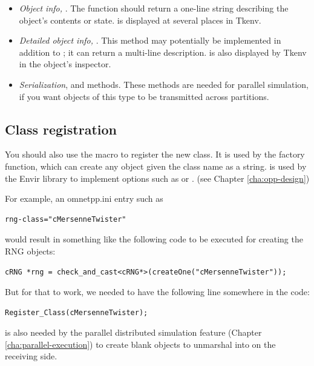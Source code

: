\begin{itemize}
  \item{\textit{Object info,} . The  function
        should return a one-line string describing the object's contents or state.
         is displayed at several places in Tkenv.}
  \item{\textit{Detailed object info,} .
        This method may potentially be implemented in addition to ;
        it can return a multi-line description.  is also
        displayed by Tkenv in the object's inspector.}
  \item{\textit{Serialization},  and  methods.
        These methods are needed for parallel simulation, if you want
        objects of this type to be transmitted across partitions.}
\end{itemize}


\subsection{Class registration}

You should also use the  macro to register the
new class. It is used by the  factory function, which can
create any object given the class name as a string. 
is used by the Envir library to implement  options
such as  or .
(see Chapter \ref{cha:opp-design})

For example, an omnetpp.ini entry such as

\begin{verbatim}
rng-class="cMersenneTwister"
\end{verbatim}

would result in something like the following code to be executed
for creating the RNG objects:

\begin{verbatim}
cRNG *rng = check_and_cast<cRNG*>(createOne("cMersenneTwister"));
\end{verbatim}

But for that to work, we needed to have the following line somewhere in the code:

\begin{verbatim}
Register_Class(cMersenneTwister);
\end{verbatim}

 is also needed by the parallel distributed simulation feature
(Chapter \ref{cha:parallel-execution}) to create blank objects to unmarshal into
on the receiving side.


